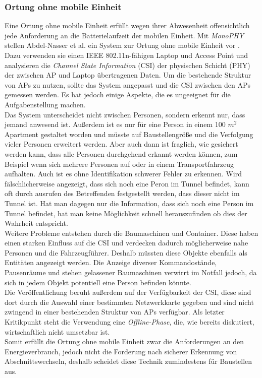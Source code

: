 \subsubsection{Ortung ohne mobile Einheit}
Eine Ortung ohne mobile Einheit erfüllt wegen ihrer Abwesenheit offensichtlich jede Anforderung an die Batterielaufzeit der mobilen Einheit.
Mit \emph{MonoPHY} stellen Abdel-Nasser et al. ein System zur Ortung ohne mobile Einheit vor \cite{abdel2013monophy}. \\
Dazu verwenden sie einen IEEE 802.11n-fähigen Laptop und Access Point und analysieren die \emph{Channel State Information} (CSI) der physischen Schicht (PHY) der zwischen AP und Laptop übertragenen Daten.
Um die bestehende Struktur von APs zu nutzen, sollte das System angepasst und die CSI zwischen den APs gemessen werden.
Es hat jedoch einige Aspekte, die es ungeeignet für die Aufgabenstellung machen.\\
Das System unterscheidet nicht zwischen Personen, sondern erkennt nur, dass jemand anwesend ist. 
Außerdem ist es nur für eine Person in einem 100 $m^2$ Apartment gestaltet worden und müsste auf Baustellengröße und die Verfolgung vieler Personen erweitert werden.
Aber auch dann ist fraglich, wie gesichert werden kann, dass alle Personen durchgehend erkannt werden können, zum Beispiel wenn sich mehrere Personen auf oder in einem Transportfahrzeug aufhalten.
Auch ist es ohne Identifikation schwerer Fehler zu erkennen. 
Wird fälschlicherweise angezeigt, dass sich noch eine Peron im Tunnel befindet, kann oft durch ausrufen des Betreffenden festgestellt werden, dass dieser nicht im Tunnel ist. 
Hat man dagegen nur die Information, dass sich noch eine Person im Tunnel befindet, hat man keine Möglichkeit schnell herauszufinden ob dies der Wahrheit entspricht.\\
Weitere Probleme entstehen durch die Baumaschinen und Container. 
Diese haben einen starken Einfluss auf die CSI und verdecken dadurch möglicherweise nahe Personen und die Fahrzeugführer.
Deshalb müssten diese Objekte ebenfalls als Entitäten angezeigt werden. 
Die Anzeige diverser Kommandostände, Pausenräume und stehen gelassener Baumaschinen verwirrt im Notfall jedoch, da sich in jedem Objekt potentiell eine Person befinden könnte.\\
Die Veröffentlichung beruht außerdem auf der Verfügbarkeit der CSI, diese sind dort durch die Auswahl einer bestimmten Netzwerkkarte gegeben und sind nicht zwingend in einer bestehenden Struktur von APs verfügbar.
Als letzter Kritikpunkt steht die Verwendung eine \emph{Offline-Phase}, die, wie bereits diskutiert, wirtschaftlich nicht umsetzbar ist. \\ 
Somit erfüllt die Ortung ohne mobile Einheit zwar die Anforderungen an den Energieverbrauch, jedoch nicht die Forderung nach sicherer Erkennung von Abschnittswechseln, deshalb scheidet diese Technik zumindestens für Baustellen aus.




